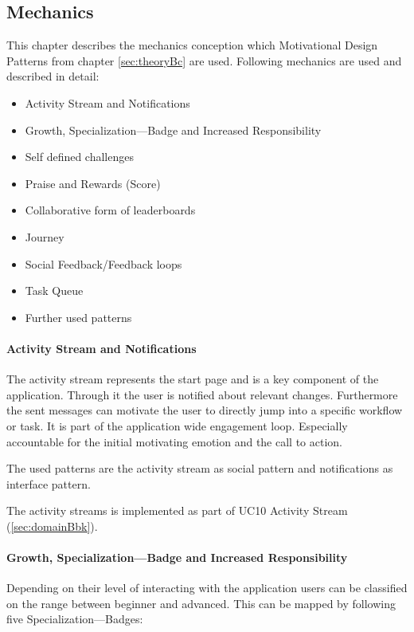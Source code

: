 \subsection{Mechanics}
\label{sec:domainCc}

This chapter describes the mechanics conception which Motivational Design Patterns from chapter \ref{sec:theoryBc} are used.
Following mechanics are used and described in detail:
\begin{itemize}
	\item Activity Stream and Notifications
	\item Growth, Specialization—Badge and Increased Responsibility
	\item Self defined challenges
	\item Praise and Rewards (Score)
	\item Collaborative form of leaderboards
	\item Journey
	\item Social Feedback/Feedback loops
	\item Task Queue
	\item Further used patterns
\end{itemize}

\paragraph*{Activity Stream and Notifications}
The activity stream represents the start page and is a key component of the application. Through it the user is notified about relevant changes. Furthermore the sent messages can motivate the user to directly jump into a specific workflow or task. 
It is part of the application wide engagement loop. Especially accountable for the initial motivating emotion and the call to action.

The used patterns are the activity stream as social pattern and notifications as interface pattern.

The activity streams is implemented as part of \ac{UC}10 Activity Stream (\ref{sec:domainBbk}).

\paragraph*{Growth, Specialization—Badge and Increased Responsibility}

Depending on their level of interacting with the application users can be classified on the range between beginner and advanced. This can be mapped by following five Specialization—Badges:

